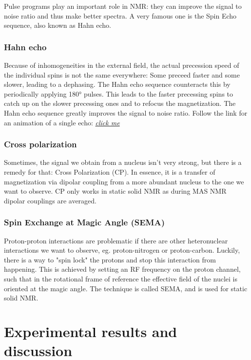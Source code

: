 \documentclass[12pt]{article}
\begin{document}
Pulse programs play an important role in NMR: they can improve the signal to noise ratio and thus make better spectra. A very famous one is the Spin Echo sequence, also known as Hahn echo.

\subsubsection{Hahn echo}

Because of inhomogeneities in the external field, the actual precession speed of the individual spins is not the same everywhere: Some preceed faster and some slower, leading to a dephasing. The Hahn echo sequence counteracts this by periodically applying 180° pulses. This leads to the faster precessing spins to catch up on the slower precessing ones and to refocus the magnetization. The Hahn echo sequence greatly improves the signal to noise ratio. Follow the link for an animation of a single echo: \href{http://xrayphysics.com/se\_3d.gif}{\textit{click me}}   

\subsubsection{Cross polarization}

Sometimes, the signal we obtain from a nucleus isn't very strong, but there is a remedy for that: Cross Polarization (CP). In essence, it is a transfer of magnetization via dipolar coupling from a more abundant nucleus to the one we want to observe. CP only works in static solid NMR as during MAS NMR dipolar couplings are averaged.

\subsubsection{Spin Exchange at Magic Angle (SEMA)}

Proton-proton interactions are problematic if there are other heteronuclear interactions we want to observe, eg. proton-nitrogen or proton-carbon. Luckily, there is a way to "spin lock" the protons and stop this interaction from happening. This is achieved by setting an RF frequency on the proton channel, such that in the rotational frame of reference the effective field of the nuclei is oriented at the magic angle. The technique is called SEMA, and is used for static solid NMR. 

\section{Experimental results and discussion}
\end{document}

